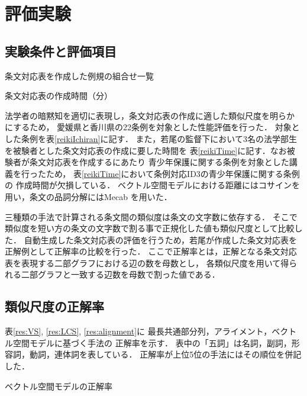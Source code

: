 \documentclass[japanese]{jnlp_1.4}
\begin{document}
\section{評価実験}
\label{sec:solution}

\subsection{実験条件と評価項目}
\label{sec:experiments}

\begin{table}[b]
\caption{条文対応表を作成した例規の組合せ一覧}
\label{reikiIchiran}

\end{table}
\begin{table}[b]
\caption{条文対応表の作成時間（分）}
\label{reikiTime}

\end{table}

法学者の暗黙知を適切に表現し，条文対応表の作成に適した類似尺度を明らかにするため，
愛媛県と香川県の22条例を対象とした性能評価を行った．
対象とした条例を表\ref{reikiIchiran}に記す．
また，若尾の監督下において3名の法学部生を被験者とした条文対応表の作成に要した時間を
表\ref{reikiTime}に記す．なお被験者が条文対応表を作成するにあたり
青少年保護に関する条例を対象とした講義を行ったため，
表\ref{reikiTime}において条例対応ID3の青少年保護に関する条例の
作成時間が欠損している．
ベクトル空間モデルにおける距離にはコサインを用い，条文の品詞分解にはMecab \cite{mecab}を用いた．

三種類の手法で計算される条文間の類似度は条文の文字数に依存する．
そこで類似度を短い方の条文の文字数で割る事で正規化した値も類似尺度として比較した．
自動生成した条文対応表の評価を行うため，若尾が作成した条文対応表を正解例として正解率の比較を行った．
ここで正解率とは，正解となる条文対応表を表現する二部グラフにおける辺の数を母数とし，
各類似尺度を用いて得られる二部グラフと一致する辺数を母数で割った値である．



\subsection{類似尺度の正解率}
\label{sec:results}

表\ref{res:VS}, \ref{res:LCS}, \ref{res:alignment}に
最長共通部分列，アライメント，ベクトル空間モデルに基づく手法の
正解率を示す．
表中の「五詞」は名詞，副詞，形容詞，動詞，連体詞を表している．
正解率が上位5位の手法にはその順位を併記した．

\begin{table}[b]
\caption{ベクトル空間モデルの正解率}\label{res:VS}

\end{table}
\end{document}

